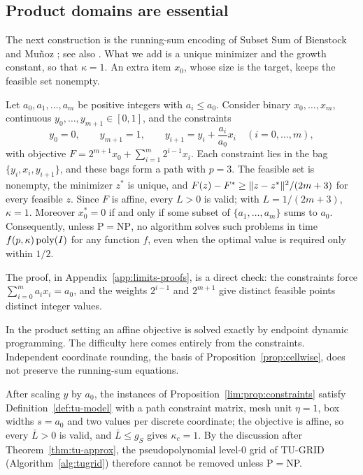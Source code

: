 \subsection{Product domains are essential}\label{sec:limits-constraints}

The next construction is the running-sum encoding of Subset Sum of Bienstock
and Mu\~noz \cite[Appendix~A]{BienstockMunoz2018}; see also
\cite[Example~1.1]{CifuentesParrilo2016}. What we add is a unique minimizer
and the growth constant, so that $\kappa=1$. An extra item $x_0$, whose size
is the target, keeps the feasible set nonempty.

\begin{proposition}\label{lim:prop:constraints}
Let $a_0,a_1,\ldots,a_m$ be positive integers with $a_i\le a_0$. Consider
binary $x_0,\ldots,x_m$, continuous $y_0,\ldots,y_{m+1}\in[0,1]$, and the
constraints
\[
y_0=0,\qquad y_{m+1}=1,\qquad y_{i+1}=y_i+\frac{a_i}{a_0}x_i\quad(i=0,\ldots,m),
\]
with objective $F=2^{m+1}x_0+\sum_{i=1}^m2^{i-1}x_i$. Each constraint lies in
the bag $\{y_i,x_i,y_{i+1}\}$, and these bags form a path with $p=3$. The
feasible set is nonempty, the minimizer $z^*$ is unique, and
$F(z)-F^{*}\ge\lVert z-z^*\rVert^2/(2m+3)$ for every feasible $z$. Since $F$ is
affine, every $L>0$ is valid; with $L=1/(2m+3)$, $\kappa=1$. Moreover
$x_0^*=0$ if and only if some subset of $\{a_1,\ldots,a_m\}$ sums to $a_0$.
Consequently, unless $\mathrm P=\mathrm{NP}$, no algorithm solves such
problems in time $f(p,\kappa)\operatorname{poly}(I)$ for any function $f$, even when the
optimal value is required only within $1/2$.
\end{proposition}

The proof, in Appendix~\ref{app:limits-proofs}, is a direct check: the
constraints force $\sum_{i=0}^ma_ix_i=a_0$, and the weights $2^{i-1}$ and
$2^{m+1}$ give distinct feasible points distinct integer values.

In the product setting an affine objective is solved exactly by endpoint
dynamic programming. The difficulty here comes entirely from the
constraints. Independent coordinate rounding, the basis of
Proposition~\ref{prop:cellwise}, does not preserve the running-sum equations.

After scaling $y$ by $a_0$, the instances of
Proposition~\ref{lim:prop:constraints} satisfy Definition~\ref{def:tu-model}
with a path constraint matrix, mesh unit $\eta=1$, box widths $s=a_0$ and two
values per discrete coordinate; the objective is affine, so every $\bar L>0$
is valid, and $\bar L\le g_S$ gives $\kappa_c=1$. By the discussion after
Theorem~\ref{thm:tu-approx}, the pseudopolynomial level-$0$ grid of
TU-GRID (Algorithm~\ref{alg:tugrid}) therefore cannot be removed unless
P${}={}$NP.


